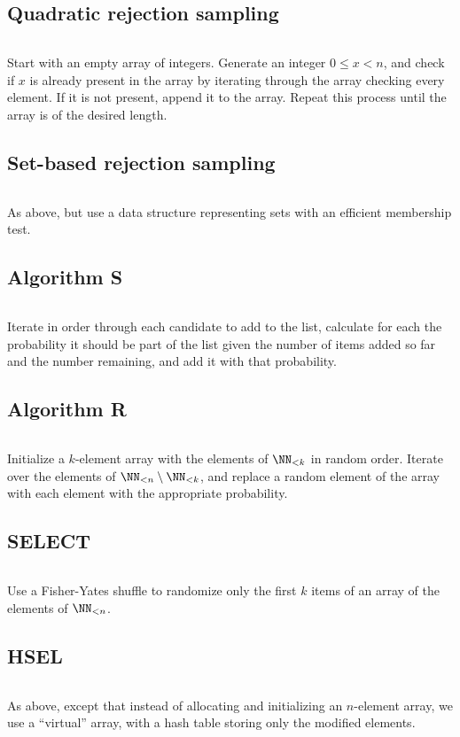 \documentclass[letterpaper,luatex,11pt]{article}
\begin{document}
\subsection{Quadratic rejection sampling}
\inputminted{Python}{code/quadraticreject.py}
Start with an empty array of integers. Generate an integer
\(0 \leq x < n\), and check if \(x\) is already present in the array
by iterating through the array checking every element. If it is not present,
append it to the array. Repeat this process until the array is of the desired length.

\subsection{Set-based rejection sampling}
\inputminted{Python}{code/rejectionsample.py}
As above, but use a data structure representing sets with an efficient membership test.
\cite{goodman1985introduction}

\subsection{Algorithm S}
\inputminted{Python}{code/iterativechoose.py}
Iterate in order through each candidate to add to the list,
calculate for each the probability it should be part of the list given
the number of items added so far and the number remaining, and add
it with that probability.
\cite{taocp2}

\subsection{Algorithm R}
\inputminted{Python}{code/reservoirsample.py}
Initialize a \(k\)-element array with the elements of \(\NN_{<k}\)
in random order. Iterate over the elements of \(\NN_{<n} \setminus \NN_{<k}\),
and replace a random element of the array with each element with the
appropriate probability.
\cite{taocp2}

\subsection{SELECT}
\inputminted{Python}{code/select.py}
Use a Fisher-Yates shuffle to randomize only the first \(k\) items
of an array of the elements of \(\NN_{<n}\). \cite{goodman1985introduction}

\subsection{HSEL}
\inputminted{Python}{code/hsel.py}
As above, except that instead of allocating and initializing an \(n\)-element array,
we use a ``virtual'' array, with a hash table storing only the modified elements.
\cite{hsel}
\end{document}
